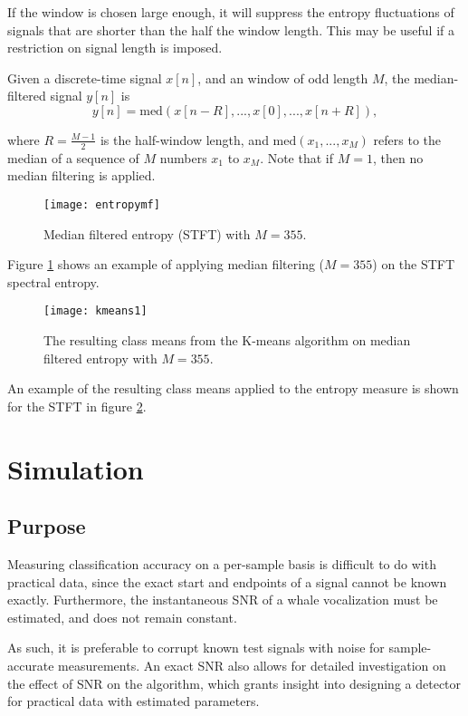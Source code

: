 If the window is chosen large enough, it will suppress the entropy fluctuations of signals that are shorter than the half the window length. This may be useful if a restriction on signal length is imposed.

Given a discrete-time signal $x[n]$, and an window of odd length $M$, the median-filtered signal $y[n]$ is
\begin{equation*}
	y[n] = \text{med}(x[n - R], ..., x[0], ..., x[n + R] ),
\end{equation*}

\noindent where $R = \frac{M-1}{2}$ is the half-window length, and $\text{med}(x_1, ..., x_M)$ refers to the median of a sequence of $M$ numbers $x_1$ to $x_M$. Note that if $M=1$, then no median filtering is applied.

\begin{figure}[h!]
	\centering
	\texttt{[image: entropymf]}
	\caption{Median filtered entropy (STFT) with $M=355$.}
	\label{fig:entropymf}
\end{figure}

Figure \ref{fig:entropymf} shows an example of applying median filtering ($M=355$) on the STFT spectral entropy.

\begin{figure}[h!]
	\centering
	\texttt{[image: kmeans1]}
	\caption{The resulting class means from the K-means algorithm on median filtered entropy with $M=355$.}
	\label{fig:kmeans1}
\end{figure}

An example of the resulting class means applied to the entropy measure is shown for the STFT in figure \ref{fig:kmeans1}.

\section{Simulation}

\subsection{Purpose}
Measuring classification accuracy on a per-sample basis is difficult to do with practical data, since the exact start and endpoints of a signal cannot be known exactly. Furthermore, the instantaneous SNR of a whale vocalization must be estimated, and does not remain constant.

As such, it is preferable to corrupt known test signals with noise for sample-accurate measurements. An exact SNR also allows for detailed investigation on the effect of SNR on the algorithm, which grants insight into designing a detector for practical data with estimated parameters.

